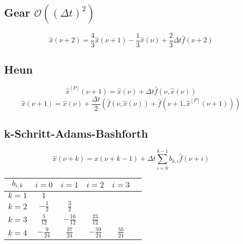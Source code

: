 \documentclass[german]{latex4ei/latex4ei_sheet}
\begin{document}
\begin{sectionbox}
\subsection[Gear]{Gear $\mathcal O((Δt)^2)$}
\begin{equation*}
	\hat{x}(\nu + 2) = \frac{4}{3} \hat{x}(\nu + 1) - \frac{1}{3} \hat{x}(\nu) + \frac{2}{3} \Delta t \hat{f}(\nu + 2)
\end{equation*}

\subsection{Heun}
\begin{equation*}
	\hat{x}^{[P]}(\nu + 1) = \hat{x}(\nu) + \Delta t \hat{f}(\nu, \hat{x}(\nu))
\end{equation*}
\begin{equation*}
	\hat{x}(\nu + 1) = \hat{x}(\nu) + \frac{\Delta t}{2} \left( \hat{f}(\nu, \hat{x}(\nu)) + \hat{f}(\nu + 1, \hat{x}^{[P]}(\nu + 1)) \right)
\end{equation*}

\subsection{k-Schritt-Adams-Bashforth}
\begin{equation*}
	\hat x(\nu + k) = \hat x(\nu + k - 1) + \Delta t\sum_{i=0}^{k-1}b_{k,i}\hat f(\nu + i)
\end{equation*}
\begin{tabularx}{\columnwidth}{C|CCCCC}
$b_{i,k}$ & $i=0$ & $i=1$ & $i=2$ & $i=3$ \\ \hline
$k=1$ & $1$ & & & \\
$k=2$ & $-\frac{1}{2}$ & $\frac{3}{2}$ & & \\
$k=3$ & $\frac{5}{12}$ & $-\frac{16}{12}$ & $\frac{23}{12}$ & \\
$k=4$ & $-\frac{9}{24}$ & $\frac{37}{24}$ & $-\frac{59}{24}$ & $\frac{55}{24}$
\end{tabularx}
\end{sectionbox}
\end{document}
